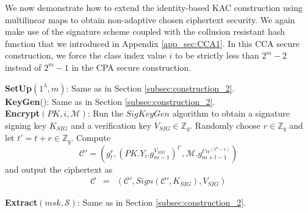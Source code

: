 We now demonstrate how to extend the identity-based KAC construction using multilinear maps to obtain non-adaptive chosen ciphertext security. We again make use of the signature scheme coupled with the collusion resistant hash function that we introduced in Appendix \ref{app_sec:CCA1}. In this CCA secure construction, we force the class index value $i$ to be strictly less than $2^m-2$ instead of $2^m-1$ in the CPA secure construction.

\noindent\textbf{SetUp}$(1^{\lambda},m)$: Same as in Section \ref{subsec:construction_2}.\\
 
\noindent \textbf{KeyGen}(): Same as in Section \ref{subsec:construction_2}.\\
 
\noindent \textbf{Encrypt}$(PK,i,\mathcal{M})$: Run the $SigKeyGen$ algorithm to obtain a signature signing key $K_{SIG}$ and a verification key $V_{SIG} \in \mathbb{Z}_q$. Randomly choose $r\in\mathbb{Z}_q$ and let $t'=t+r \in\mathbb{Z}_q$. Compute 
\begin{equation}
 \mathcal{C}'=(g^r_{l},(PK.Y_i.g^{V_{SIG}}_{m-1})^{t'},\mathcal{M}.g^{t'\alpha^{(2^m-1)}}_{m+l-1})\nonumber
\end{equation} 
\noindent and output the ciphertext as
\begin{eqnarray}
 \mathcal{C}&=&(\mathcal{C}',Sign(\mathcal{C}',K_{SIG}),V_{SIG}) \nonumber
\end{eqnarray} 
 
\noindent \textbf{Extract}$(msk,\mathcal{S})$: Same as in Section \ref{subsec:construction_2}.\\
 
